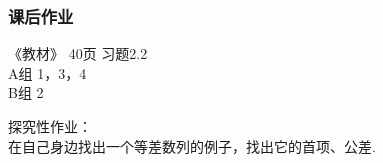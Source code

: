 \documentclass[12pt]{beamer}
\newcommand{\themename}{\textbf{\textsc{metropolis}}\xspace}
\begin{document}
	\begin{frame}\frametitle{课后作业}
	    
		《教材》 40页 习题2.2 \\
		A组 1，3，4\\
		B组 2
		\vspace{30pt}

		探究性作业：\\
		在自己身边找出一个等差数列的例子，找出它的首项、公差. 
	
	\end{frame}









\end{document}
